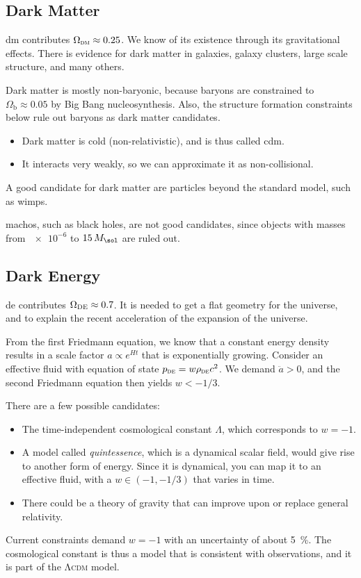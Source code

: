 \subsection*{Dark Matter}
\Ac{dm} contributes $\Omega_\textsc{dm} \approx 0.25$. We know of its existence through its gravitational effects. There is evidence for dark matter in galaxies, galaxy clusters, large scale structure, and many others.

Dark matter is mostly non-baryonic, because baryons are constrained to $\Omega_\text{b} \approx 0.05$ by Big Bang nucleosynthesis. Also, the structure formation constraints below rule out baryons as dark matter candidates.
\begin{itemize}
	\item Dark matter is cold (non-relativistic), and is thus called \ac{cdm}.
	\item It interacts very weakly, so we can approximate it as non-collisional.
\end{itemize}
A good candidate for dark matter are particles beyond the standard model, such as \acp{wimp}.

\Acp{macho}, such as black holes, are not good candidates, since objects with masses from $\num{e-6}$ to $15\, M_\sol$ are ruled out.

\subsection*{Dark Energy}
\Ac{de} contributes $\Omega_\textsc{DE} \approx 0.7$. It is needed to get a flat geometry for the universe, and to explain the recent acceleration of the expansion of the universe.

From the first Friedmann equation, we know that a constant energy density results in a scale factor $a \propto e^{Ht}$ that is exponentially growing. Consider an effective fluid with equation of state $p_\textsc{de} = w \rho_\textsc{de} c^2$. We demand $\ddot{a} > 0$, and the second Friedmann equation then yields $w < -1/3$.

There are a few possible candidates:
\begin{itemize}
	\item The time-independent cosmological constant $\Lambda$, which corresponds to $w=-1$.
	\item A model called \emph{quintessence}, which is a dynamical scalar field, would give rise to another form of energy. Since it is dynamical, you can map it to an effective fluid, with a $w \in (-1, -1/3)$ that varies in time.
	\item There could be a theory of gravity that can improve upon or replace general relativity.
\end{itemize}
Current constraints demand $w = -1$ with an uncertainty of about \SI{5}{\percent}. The cosmological constant is thus a model that is consistent with observations, and it is part of the \textsc{Λcdm} model.

